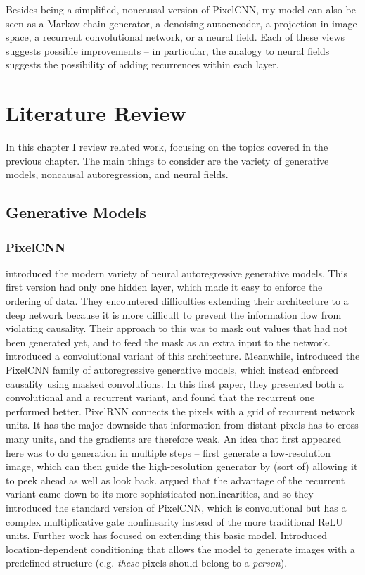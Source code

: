 \documentclass[11pt, a4paper, openany]{book}
\begin{document}
Besides being a simplified, noncausal version of PixelCNN, my model can also be seen as a Markov chain generator, a denoising autoencoder, a projection in image space, a recurrent convolutional network, or a neural field. Each of these views suggests possible improvements -- in particular, the analogy to neural fields suggests the possibility of adding recurrences within each layer.


\chapter{Literature Review}
\label{cha:review}

In this chapter I review related work, focusing on the topics covered in the previous chapter. The main things to consider are the variety of generative models, noncausal autoregression, and neural fields.

\section{Generative Models}

\subsection{PixelCNN}

\citet{nade} introduced the modern variety of neural autoregressive generative models. This first version had only one hidden layer, which made it easy to enforce the ordering of data. They encountered difficulties extending their architecture to a deep network \citep{dnade} because it is more difficult to prevent the information flow from violating causality. Their approach to this was to mask out values that had not been generated yet, and to feed the mask as an extra input to the network. \citet{cnade} introduced a convolutional variant of this architecture. Meanwhile, \citet{pixelcnn1} introduced the PixelCNN family of autoregressive generative models, which instead enforced causality using masked convolutions. In this first paper, they presented both a convolutional and a recurrent variant, and found that the recurrent one performed better. PixelRNN connects the pixels with a grid of recurrent network units. It has the major downside that information from distant pixels has to cross many units, and the gradients are therefore weak. An idea that first appeared here was to do generation in multiple steps -- first generate a low-resolution image, which can then guide the high-resolution generator by (sort of) allowing it to peek ahead as well as look back.  argued that the advantage of the recurrent variant came down to its more sophisticated nonlinearities, and so they introduced the standard version of PixelCNN, which is convolutional but has a complex multiplicative gate nonlinearity instead of the more traditional ReLU units. Further work has focused on extending this basic model. \citet{pixelcnn3} Introduced location-dependent conditioning that allows the model to generate images with a predefined structure (e.g. \emph{these} pixels should belong to a \emph{person}).
\end{document}
